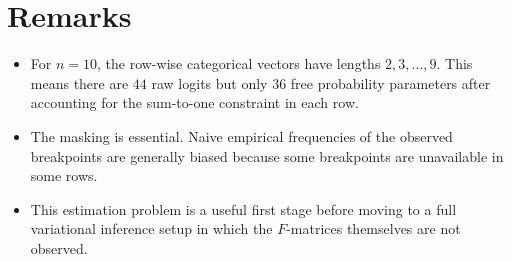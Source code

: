 \documentclass[11pt]{article}
\begin{document}
\section{Remarks}

\begin{itemize}[leftmargin=2em]
    \item For $n=10$, the row-wise categorical vectors have lengths
    $2,3,\ldots,9$. This means there are $44$ raw logits but only
    $36$ free probability parameters after accounting for the sum-to-one
    constraint in each row.
    \item The masking is essential. Naive empirical frequencies of the observed
    breakpoints are generally biased because some breakpoints are unavailable in
    some rows.
    \item This estimation problem is a useful first stage before moving to a
    full variational inference setup in which the $F$-matrices themselves are not
    observed.
\end{itemize}
\end{document}
